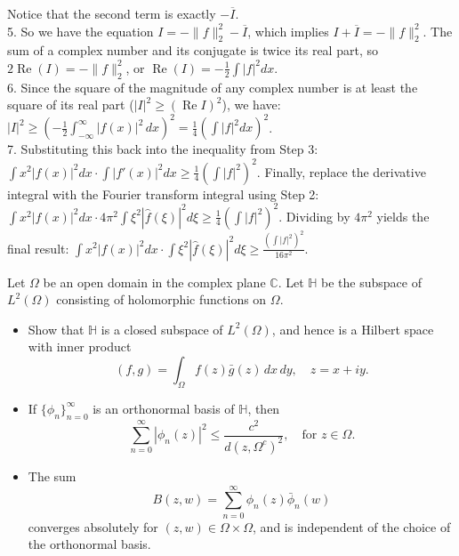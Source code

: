\begin{solution}
Notice that the second term is exactly $-\overline{I}$. \\[1em]
5. So we have the equation $I = -\|f\|_2^2 - \overline{I}$, which implies $I + \overline{I} = -\|f\|_2^2$.
The sum of a complex number and its conjugate is twice its real part, so $2 \operatorname{Re}(I) = -\|f\|_2^2$, or $\operatorname{Re}(I) = -\frac{1}{2} \int |f|^2 dx$. \\[1em]
6. Since the square of the magnitude of any complex number is at least the square of its real part ($|I|^2 \geq (\operatorname{Re} I)^2$), we have:
$|I|^2 \geq \left( -\frac{1}{2} \int_{-\infty}^{\infty} |f(x)|^2 \, dx \right)^2 = \frac{1}{4} \left( \int |f|^2 dx \right)^2$. \\[1em]
7. Substituting this back into the inequality from Step 3:
$\int x^2 |f(x)|^2 dx \cdot \int |f'(x)|^2 dx \geq \frac{1}{4} \left( \int |f|^2 \right)^2$.
Finally, replace the derivative integral with the Fourier transform integral using Step 2:
$\int x^2 |f(x)|^2 dx \cdot 4\pi^2 \int \xi^2 |\hat{f}(\xi)|^2 d\xi \geq \frac{1}{4} \left( \int |f|^2 \right)^2$.
Dividing by $4\pi^2$ yields the final result:
$\int x^2 |f(x)|^2 dx \cdot \int \xi^2 |\hat{f}(\xi)|^2 d\xi \geq \frac{(\int |f|^2)^2}{16\pi^2}$.
\end{solution}

\begin{exercise}
\label{analysis:2014:6}
Let $\Omega$ be an open domain in the complex plane $\mathbb{C}$. Let $\mathbb{H}$ be the subspace of $L^2(\Omega)$ consisting of holomorphic functions on $\Omega$.

\begin{itemize}
\item[a)] Show that $\mathbb{H}$ is a closed subspace of $L^2(\Omega)$, and hence is a Hilbert space with inner product
\[
(f,g) = \int_{\Omega}f(z)\bar{g}(z)\,dx\,dy, \quad z=x+iy.
\]

\item[b)] If $\{\phi_n\}_{n=0}^{\infty}$ is an orthonormal basis of $\mathbb{H}$, then
\[
\sum_{n=0}^{\infty}|\phi_n(z)|^2 \leq \frac{c^2}{d(z,\Omega^c)^2}, \quad \text{for } z\in\Omega.
\]

\item[c)] The sum
\[
B(z,w) = \sum_{n=0}^{\infty}\phi_n(z)\bar{\phi}_n(w)
\]
converges absolutely for $(z,w)\in\Omega\times\Omega$, and is independent of the choice of the orthonormal basis.
\end{itemize}
\end{exercise}

